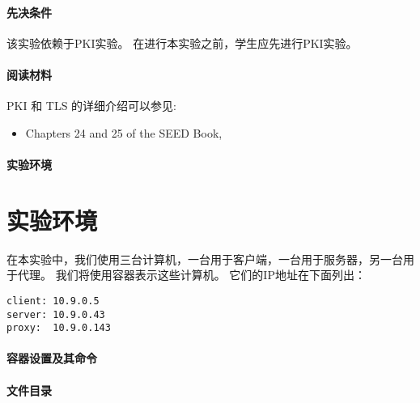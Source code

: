 \paragraph{先决条件} 该实验依赖于PKI实验。 在进行本实验之前，学生应先进行PKI实验。

\paragraph{阅读材料}
PKI 和 TLS 的详细介绍可以参见:

\begin{itemize}
\item Chapters 24 and 25 of the SEED Book, \seedbook
\end{itemize}


\paragraph{实验环境} \seedenvironmentB




\newpage

\section{实验环境}

在本实验中，我们使用三台计算机，一台用于客户端，一台用于服务器，另一台用于代理。
我们将使用容器表示这些计算机。
它们的IP地址在下面列出：

\begin{lstlisting}
client: 10.9.0.5
server: 10.9.0.43
proxy:  10.9.0.143
\end{lstlisting}



\paragraph{容器设置及其命令}




\paragraph{文件目录}






